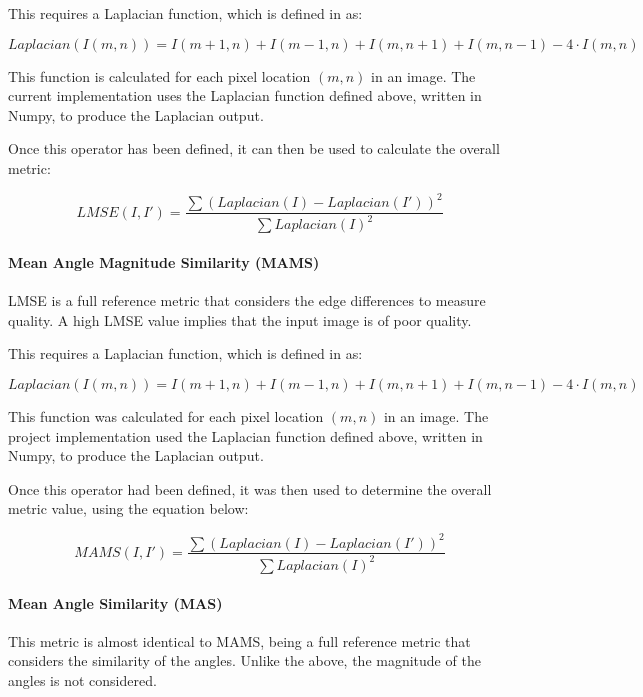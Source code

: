 \documentclass[12pt,a4paper]{article}
\begin{document}
                This requires a Laplacian function, which is defined in \cite{LMSEPaper} as:

                $$Laplacian(I(m, n)) = I(m+1, n) + I(m-1, n) + I(m, n+1) + I(m, n-1) - 4\cdot I(m, n)$$

                This function is calculated for each pixel location $(m, n)$ in an image. The current implementation uses the Laplacian function defined above, written in Numpy, to produce the Laplacian output. 
                \cite{LMSEPaper}

                Once this operator has been defined, it can then be used to calculate the overall metric: 

                $$LMSE(I, I') = \frac{\sum (Laplacian(I) - Laplacian(I'))^2}{\sum Laplacian(I)^2}$$
                
            \paragraph{Mean Angle Magnitude Similarity (MAMS)}
            LMSE is a full reference metric that considers the edge differences to measure quality. A high LMSE value implies that the input image is of poor quality. 
                
            This requires a Laplacian function, which is defined in \cite{LMSEPaper} as:

            $$Laplacian(I(m, n)) = I(m+1, n) + I(m-1, n) + I(m, n+1) + I(m, n-1) - 4\cdot I(m, n)$$

            This function was calculated for each pixel location $(m, n)$ in an image. The project implementation used the Laplacian function defined above, written in Numpy, to produce the Laplacian output. 
            \cite{LMSEPaper}

            Once this operator had been defined, it was then used to determine the overall metric value, using the equation below:

            $$MAMS(I, I') = \frac{\sum (Laplacian(I) - Laplacian(I'))^2}{\sum Laplacian(I)^2}$$

            \paragraph{Mean Angle Similarity (MAS)}
            This metric is almost identical to MAMS, being a full reference metric that considers the similarity of the angles. Unlike the above, the magnitude of the angles is not considered.
\end{document}

